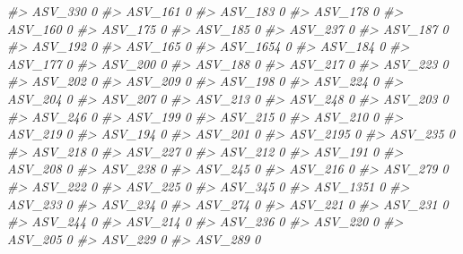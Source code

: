 \documentclass[
]{article}
\newenvironment{Shaded}{\begin{snugshade}}{\end{snugshade}}
\newcommand{\CommentTok}[1]{\textcolor[rgb]{0.56,0.35,0.01}{\textit{#1}}}
\begin{document}
\begin{Shaded}
\begin{Highlighting}[]
\CommentTok{\#\textgreater{} ASV\_330   0}
\CommentTok{\#\textgreater{} ASV\_161   0}
\CommentTok{\#\textgreater{} ASV\_183   0}
\CommentTok{\#\textgreater{} ASV\_178   0}
\CommentTok{\#\textgreater{} ASV\_160   0}
\CommentTok{\#\textgreater{} ASV\_175   0}
\CommentTok{\#\textgreater{} ASV\_185   0}
\CommentTok{\#\textgreater{} ASV\_237   0}
\CommentTok{\#\textgreater{} ASV\_187   0}
\CommentTok{\#\textgreater{} ASV\_192   0}
\CommentTok{\#\textgreater{} ASV\_165   0}
\CommentTok{\#\textgreater{} ASV\_1654  0}
\CommentTok{\#\textgreater{} ASV\_184   0}
\CommentTok{\#\textgreater{} ASV\_177   0}
\CommentTok{\#\textgreater{} ASV\_200   0}
\CommentTok{\#\textgreater{} ASV\_188   0}
\CommentTok{\#\textgreater{} ASV\_217   0}
\CommentTok{\#\textgreater{} ASV\_223   0}
\CommentTok{\#\textgreater{} ASV\_202   0}
\CommentTok{\#\textgreater{} ASV\_209   0}
\CommentTok{\#\textgreater{} ASV\_198   0}
\CommentTok{\#\textgreater{} ASV\_224   0}
\CommentTok{\#\textgreater{} ASV\_204   0}
\CommentTok{\#\textgreater{} ASV\_207   0}
\CommentTok{\#\textgreater{} ASV\_213   0}
\CommentTok{\#\textgreater{} ASV\_248   0}
\CommentTok{\#\textgreater{} ASV\_203   0}
\CommentTok{\#\textgreater{} ASV\_246   0}
\CommentTok{\#\textgreater{} ASV\_199   0}
\CommentTok{\#\textgreater{} ASV\_215   0}
\CommentTok{\#\textgreater{} ASV\_210   0}
\CommentTok{\#\textgreater{} ASV\_219   0}
\CommentTok{\#\textgreater{} ASV\_194   0}
\CommentTok{\#\textgreater{} ASV\_201   0}
\CommentTok{\#\textgreater{} ASV\_2195  0}
\CommentTok{\#\textgreater{} ASV\_235   0}
\CommentTok{\#\textgreater{} ASV\_218   0}
\CommentTok{\#\textgreater{} ASV\_227   0}
\CommentTok{\#\textgreater{} ASV\_212   0}
\CommentTok{\#\textgreater{} ASV\_191   0}
\CommentTok{\#\textgreater{} ASV\_208   0}
\CommentTok{\#\textgreater{} ASV\_238   0}
\CommentTok{\#\textgreater{} ASV\_245   0}
\CommentTok{\#\textgreater{} ASV\_216   0}
\CommentTok{\#\textgreater{} ASV\_279   0}
\CommentTok{\#\textgreater{} ASV\_222   0}
\CommentTok{\#\textgreater{} ASV\_225   0}
\CommentTok{\#\textgreater{} ASV\_345   0}
\CommentTok{\#\textgreater{} ASV\_1351  0}
\CommentTok{\#\textgreater{} ASV\_233   0}
\CommentTok{\#\textgreater{} ASV\_234   0}
\CommentTok{\#\textgreater{} ASV\_274   0}
\CommentTok{\#\textgreater{} ASV\_221   0}
\CommentTok{\#\textgreater{} ASV\_231   0}
\CommentTok{\#\textgreater{} ASV\_244   0}
\CommentTok{\#\textgreater{} ASV\_214   0}
\CommentTok{\#\textgreater{} ASV\_236   0}
\CommentTok{\#\textgreater{} ASV\_220   0}
\CommentTok{\#\textgreater{} ASV\_205   0}
\CommentTok{\#\textgreater{} ASV\_229   0}
\CommentTok{\#\textgreater{} ASV\_289   0}

\end{Highlighting}
\end{Shaded}
\end{document}
